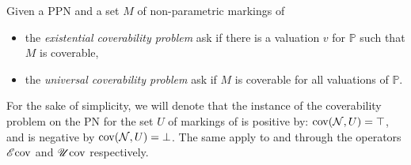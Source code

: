 \begin{defi}
  Given a \ac{PPN} \SPTPm and a set $M$ of non-parametric markings of \PPN
  \begin{itemize}
    \item the \emph{existential coverability problem} ask if there is a valuation $v$ for $\mathbb{P}$ such that $M$ is coverable,
    \item the \emph{universal   coverability problem} ask if $M$ is coverable for all valuations of $\mathbb{P}$.
  \end{itemize}
\end{defi}

For the sake of simplicity, we will denote that the instance of the coverability problem on the \ac{PN} \N for the set $U$ of markings of \N is positive by: $\operatorname{cov}(\mathcal{N}, U) = \top$, and is negative by $\operatorname{cov}(\mathcal{N}, U) = \bot$. The same apply to \Ecov and \Ucov through the operators $\operatorname{\mathscr{E}cov}$ and $\operatorname{\mathscr{U}cov}$ respectively.

